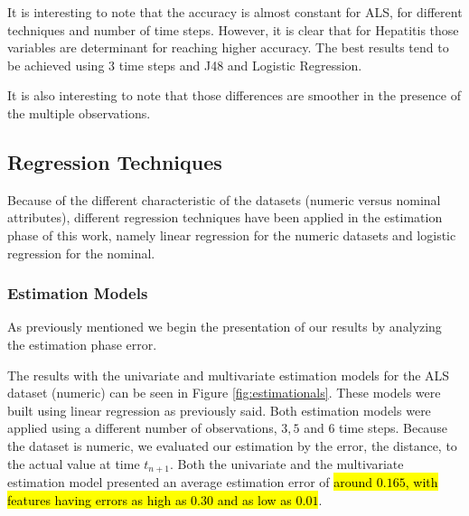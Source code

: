 It is interesting to note that the accuracy is almost constant for ALS, for different techniques and number of time steps. However, it is
clear that for Hepatitis those variables are determinant for reaching higher accuracy. The best results tend to be achieved using 3 time steps and 
J48 and Logistic Regression. 

It is also interesting to note that those differences are smoother in the presence of the multiple observations.

\subsection{Regression Techniques}
\label{subsection:regression}

Because of the different characteristic of the datasets (numeric versus nominal attributes), different regression techniques have been applied
 in the estimation phase of this work, namely linear regression for the numeric datasets and logistic regression for the nominal.
  
\subsubsection{Estimation Models}
\label{subsubsection:estimation_regression}

As previously mentioned we begin the presentation of our results by analyzing the estimation phase error.

The results with the univariate and multivariate estimation models for the ALS dataset (numeric) can be seen in 
Figure \ref{fig:estimationals}. These models were built using linear regression as previously said. Both estimation models were 
applied using a different number of observations, $3, 5$ and $6$ time steps.
 Because the dataset is numeric, we evaluated our estimation by the error, the distance, to the actual value at time $t_{n+1}$.
 Both the univariate and the multivariate estimation model presented an average estimation error of \hl{around $0.165$, with
 features having errors as high as $0.30$ and as low as $0.01$}.
  

